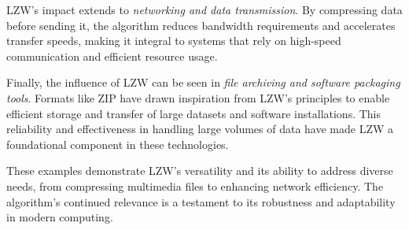 LZW's impact extends to \textit{networking and data transmission}. By compressing data before sending it, the algorithm reduces bandwidth requirements and accelerates transfer speeds, making it integral to systems that rely on high-speed communication and efficient resource usage.

\vspace{10pt}

Finally, the influence of LZW can be seen in \textit{file archiving and software packaging tools}. Formats like ZIP have drawn inspiration from LZW’s principles to enable efficient storage and transfer of large datasets and software installations. This reliability and effectiveness in handling large volumes of data have made LZW a foundational component in these technologies.

\vspace{10pt}

These examples demonstrate LZW’s versatility and its ability to address diverse needs, from compressing multimedia files to enhancing network efficiency. The algorithm’s continued relevance is a testament to its robustness and adaptability in modern computing.
